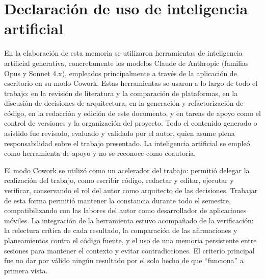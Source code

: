 \clearpage
\chapter*{Declaración de uso de inteligencia artificial}

En la elaboración de esta memoria se utilizaron herramientas de inteligencia
artificial generativa, concretamente los modelos Claude de Anthropic (familias
Opus y Sonnet 4.x), empleados principalmente a través de la aplicación de
escritorio en su modo Cowork. Estas herramientas se usaron a lo largo de todo
el trabajo: en la revisión de literatura y la comparación de
plataformas, en la discusión de decisiones de arquitectura, 
en la generación y refactorización de código, en la redacción y
edición de este documento,  y en tareas de apoyo
como el control de versiones y la organización del proyecto. Todo el contenido
generado o asistido fue revisado, evaluado y validado por el autor,
quien asume plena responsabilidad sobre el trabajo presentado. La
inteligencia artificial se empleó como herramienta de apoyo y no se reconoce
como coautoría.

El modo Cowork se utilizó como un acelerador del trabajo: permitió delegar la
realización del trabajo, como escribir código, redactar y editar, ejecutar y
verificar, conservando el rol del autor como arquitecto de las decisiones.
Trabajar de esta forma permitió mantener la constancia durante todo el semestre,
compatibilizando con las labores del autor como desarrollador de aplicaciones
móviles. La integración de la herramienta estuvo acompañado de la verificación:
la relectura crítica de cada resultado, la comparación de las afirmaciones y
planeamientos contra el código fuente, y el uso de una memoria persistente entre
sesiones para mantener el contexto y evitar contradicciones. El criterio
principal fue no dar por válido ningún resultado por el solo hecho de que
``funciona'' a primera vista.

